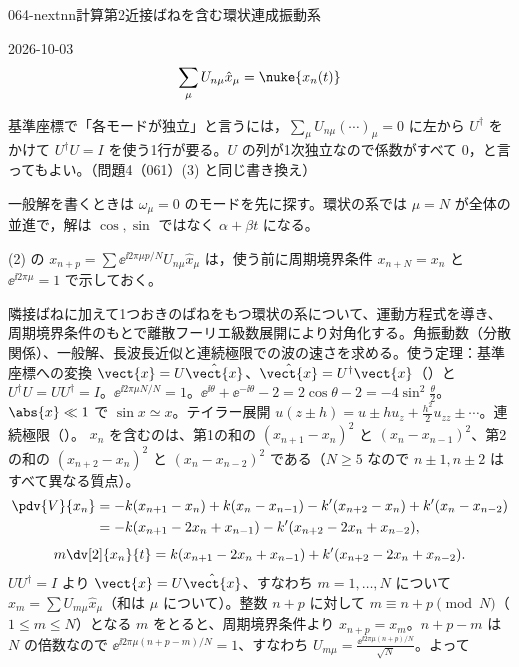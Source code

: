 \documentclass[uplatex,dvipdfmx,a4paper,11pt]{jsarticle}
\begin{document}
\begin{mondai}{064-nextnn}{計算}{第2近接ばねを含む環状連成振動系}
\begin{kotaeutsushi}{2026-10-03}
\[  \sum_{\mu}U_{n\mu}\hat{x}_{\mu}=\nuke{x_n(t)}
\]
\mikai
{}
\mikai
\end{kotaeutsushi}
\begin{kizuki}
\item 基準座標で「各モードが独立」と言うには，$\sum_{\mu}U_{n\mu}(\cdots)_{\mu}=0$ に左から $U^{\dagger}$ をかけて $U^{\dagger}U=I$ を使う1行が要る。$U$ の列が1次独立なので係数がすべて 0，と言ってもよい。（問題4（061）(3) と同じ書き換え）
\item 一般解を書くときは $\omega_{\mu}=0$ のモードを先に探す。環状の系では $\mu=N$ が全体の並進で，解は $\cos,\sin$ ではなく $\alpha+\beta t$ になる。
\item (2) の $x_{n+p}=\sum\ee^{\ii2\pi\mu p/N}U_{n\mu}\hat{x}_{\mu}$ は，使う前に周期境界条件 $x_{n+N}=x_n$ と $\ee^{\ii2\pi\mu}=1$ で示しておく。
\end{kizuki}
\begin{tadashii}
\houshin 隣接ばねに加えて1つおきのばねをもつ環状の系について、運動方程式を導き、周期境界条件のもとで離散フーリエ級数展開により対角化する。角振動数（分散関係）、一般解、長波長近似と連続極限での波の速さを求める。使う定理：基準座標への変換 $\vect{x}=U\hat{\vect{x}}$、$\hat{\vect{x}}=U^{\dagger}\vect{x}$（）と $U^{\dagger}U=UU^{\dagger}=I$。$\ee^{\ii2\pi\mu N/N}=1$。$\ee^{\ii\theta}+\ee^{-\ii\theta}-2=2\cos\theta-2=-4\sin^{2}\frac{\theta}{2}$。$\abs{x}\ll1$ で $\sin x\simeq x$。テイラー展開 $u(z\pm h)=u\pm hu_z+\frac{h^{2}}{2}u_{zz}\pm\cdots$。連続極限（）。 %
\keisan
{} $x_n$ を含むのは、第1の和の $(x_{n+1}-x_n)^{2}$ と $(x_n-x_{n-1})^{2}$、第2の和の $(x_{n+2}-x_n)^{2}$ と $(x_n-x_{n-2})^{2}$ である（$N\ge5$ なので $n\pm1,n\pm2$ はすべて異なる質点）。
\begin{align*}
\pdv{V}{x_n}&=-k(x_{n+1}-x_n)+k(x_n-x_{n-1})-k'(x_{n+2}-x_n)+k'(x_n-x_{n-2})\\
&=-k(x_{n+1}-2x_n+x_{n-1})-k'(x_{n+2}-2x_n+x_{n-2}),
\end{align*}
\[
m\dv[2]{x_n}{t}=k(x_{n+1}-2x_n+x_{n-1})+k'(x_{n+2}-2x_n+x_{n-2}).
\]
 $UU^{\dagger}=I$ より $\vect{x}=U\hat{\vect{x}}$、すなわち $m=1,\dots,N$ について $x_m=\sum U_{m\mu}\hat{x}_{\mu}$（和は $\mu$ について）。整数 $n+p$ に対して $m\equiv n+p\pmod N$（$1\le m\le N$）となる $m$ をとると、周期境界条件より $x_{n+p}=x_m$。$n+p-m$ は $N$ の倍数なので $\ee^{\ii2\pi\mu(n+p-m)/N}=1$、すなわち $U_{m\mu}=\frac{\ee^{\ii2\pi\mu(n+p)/N}}{\sqrt{N}}$。よって

\end{tadashii}
\end{mondai}
\end{document}
